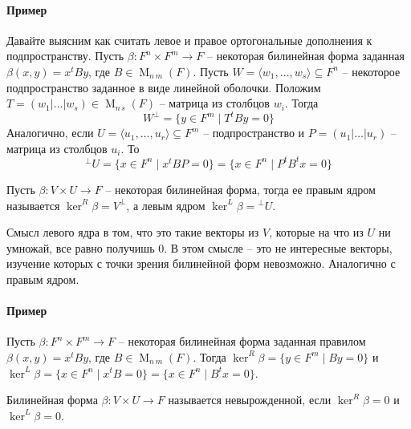 \paragraph{Пример}

Давайте выясним как считать левое и правое ортогональные дополнения к подпространству.
Пусть $\beta\colon F^n\times F^m \to F$ -- некоторая билинейная форма заданная $\beta(x,y) = x^t B y$, где $B\in \operatorname{M}_{n\,m}(F)$.
Пусть $W = \langle w_1,\ldots,w_s\rangle\subseteq F^n$ -- некоторое подпространство заданное в виде линейной оболочки.
Положим $T = (w_1|\ldots|w_s)\in\operatorname{M}_{n\,s}(F)$ -- матрица из столбцов $w_i$.
Тогда 
\[
W^\bot = \{y\in F^m \mid T^t By = 0\}
\]
Аналогично, если $U=\langle u_1,\ldots,u_r \rangle \subseteq F^m$ -- подпространство и $P = (u_1|\ldots|u_r)$ -- матрица из столбцов $u_i$.
То
\[
{}^\bot U = \{x\in F^n\mid x^t B P = 0\} = 
\{x\in F^n \mid P^t B^t x = 0\}
\]


\begin{definition}
Пусть $\beta\colon V\times U\to F$ -- некоторая билинейная форма, тогда ее правым ядром называется $\ker^R \beta =V^\bot$, а левым ядром $\ker^L\beta = {}^\bot U$.
\end{definition}

Смысл левого ядра в том, что это такие векторы из $V$, которые на что из $U$ ни умножай, все равно получишь $0$.
В этом смысле -- это не интересные векторы, изучение которых с точки зрения билинейной форм невозможно.
Аналогично с правым ядром.

\paragraph{Пример}

Пусть $\beta\colon F^n\times F^m \to F$ -- некоторая билинейная форма заданная правилом $\beta(x,y) = x^t By$, где $B\in \operatorname{M}_{n\,m}(F)$.
Тогда
$\ker^R \beta = \{y\in F^m\mid By = 0\}$ и $\ker^L\beta = \{x\in F^n \mid x^t B = 0\} = \{x\in F^n \mid B^t x = 0\}$.

\begin{definition}
Билинейная форма $\beta\colon V\times U\to F$ называется невырожденной, если $\ker^R\beta = 0$ и $\ker^L\beta = 0$.
\end{definition}


